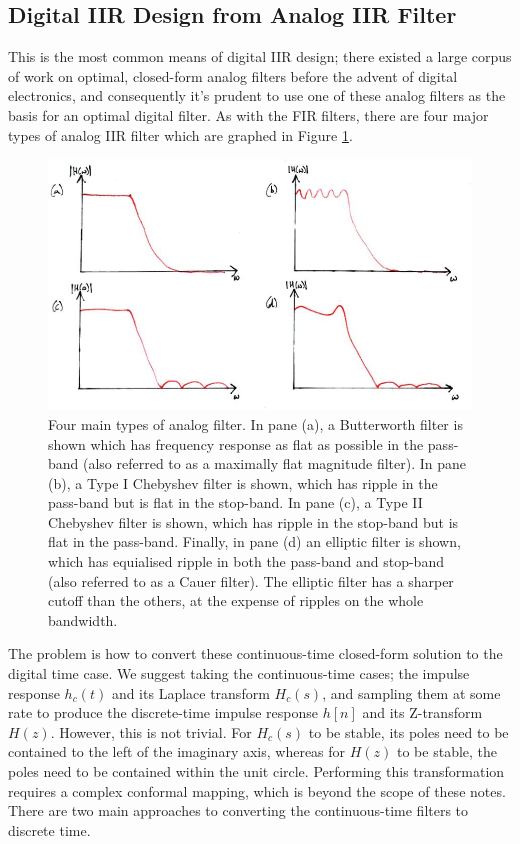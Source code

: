 \subsection{Digital IIR Design from Analog IIR Filter}
%
This is the most common means of digital IIR design; there existed a large
corpus of work on optimal, closed-form analog filters before the advent of digital
electronics, and consequently it's prudent to use one of these analog
filters as the basis for an optimal digital filter. As with the
FIR filters, there are four major types of analog IIR filter which are
graphed in Figure \ref{fig::lecture_18_analog_filters}.\\
%
\begin{figure}[H]
  \includegraphics[width=\textwidth]{images/lecture_18_analog_filters.JPG}
  \caption{Four main types of analog filter. In pane (a), a Butterworth
    filter is shown which has frequency response as flat as possible in the
    pass-band (also referred to as a maximally flat magnitude filter). In
    pane (b), a Type I Chebyshev filter is shown, which has ripple in the
    pass-band but is flat in the stop-band. In pane (c), a Type II Chebyshev
    filter is shown, which has ripple in the stop-band but is flat in the
    pass-band. Finally, in pane (d) an elliptic filter is shown, which
    has equialised ripple in both the pass-band and stop-band (also
    referred to as a Cauer filter). The elliptic filter has a sharper cutoff
    than the others, at the expense of ripples on the whole bandwidth.
  }
  \label{fig::lecture_18_analog_filters}
\end{figure}
%
The problem is how to convert these continuous-time closed-form solution to
the digital time case. We suggest taking the continuous-time cases;
the impulse response $h_c(t)$ and its Laplace transform $H_c(s)$, and
sampling them at some rate to produce the discrete-time impulse response
$h[n]$ and its Z-transform $H(z)$. However, this is not trivial. For
$H_c(s)$ to be stable, its poles need to be contained to the left of the
imaginary axis, whereas for $H(z)$ to be stable, the poles need to be
contained within the unit circle. Performing this transformation requires
a complex conformal mapping, which is beyond the scope of these notes.\\
%
There are two main approaches to converting the continuous-time filters
to discrete time.

